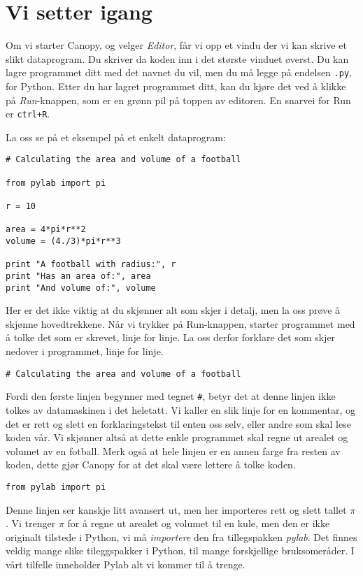 \documentclass[a4paper, 11pt, notitlepage]{article}
\begin{document}
\section*{Vi setter igang}

Om vi starter Canopy, og velger \emph{Editor}, får vi opp et vindu der vi kan skrive et slikt dataprogram. Du skriver da koden inn i det største vinduet øverst. Du kan lagre programmet ditt med det navnet du vil, men du må legge på endelsen \verb+.py+, for Python. Etter du har lagret programmet ditt, kan du kjøre det ved å klikke på \emph{Run}-knappen, som er en grønn pil på toppen av editoren. En snarvei for Run er \verb!ctrl+R!.

La oss se på et eksempel på et enkelt dataprogram:
\begin{lstlisting}
# Calculating the area and volume of a football

from pylab import pi 

r = 10

area = 4*pi*r**2
volume = (4./3)*pi*r**3

print "A football with radius:", r
print "Has an area of:", area 
print "And volume of:", volume
\end{lstlisting}

Her er det ikke viktig at du skjønner alt som skjer i detalj, men la oss prøve å skjønne hovedtrekkene. Når vi trykker på Run-knappen, starter programmet med å tolke det som er skrevet, linje for linje. La oss derfor forklare det som skjer nedover i programmet, linje for linje.

\vspace{0.4cm}
\begin{lstlisting}
# Calculating the area and volume of a football
\end{lstlisting}
\vspace{-0.3cm}
Fordi den første linjen begynner med tegnet \verb+#+, betyr det at denne linjen ikke tolkes av datamaskinen i det heletatt. Vi kaller en slik linje for en kommentar, og det er rett og slett en forklaringstekst til enten oss selv, eller andre som skal lese koden vår. Vi skjønner altså at dette enkle programmet skal regne ut arealet og volumet av en fotball. Merk også at hele linjen er en annen farge fra resten av koden, dette gjør Canopy for at det skal være lettere å tolke koden.

\vspace{0.4cm}
\begin{lstlisting}
from pylab import pi
\end{lstlisting}
\vspace{-0.3cm}
Denne linjen ser kanskje litt avansert ut, men her importeres rett og slett tallet $\pi$. Vi trenger $\pi$ for å regne ut arealet og volumet til en kule, men den er ikke originalt tilstede i Python, vi må \emph{importere} den fra tillegspakken \emph{pylab}. Det finnes veldig mange slike tileggspakker i Python, til mange forskjellige bruksomeråder. I vårt tilfelle inneholder Pylab alt vi kommer til å trenge.
\end{document}
